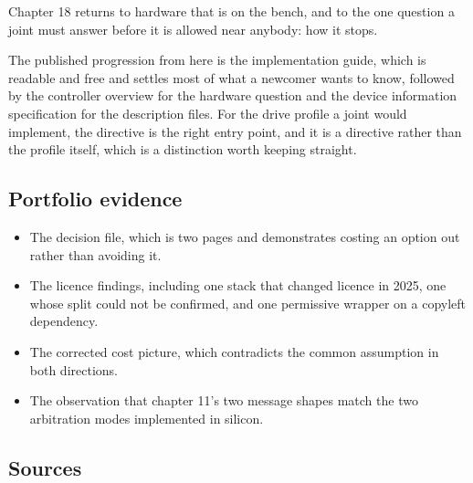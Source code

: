 Chapter 18 returns to hardware that is on the bench, and to the one question a
joint must answer before it is allowed near anybody: how it stops.

The published progression from here is the implementation guide, which is
readable and free and settles most of what a newcomer wants to know, followed by
the controller overview for the hardware question and the device information
specification for the description files. For the drive profile a joint would
implement, the directive is the right entry point, and it is a directive rather
than the profile itself, which is a distinction worth keeping straight.

\subsection*{Portfolio evidence}

\begin{itemize}
\item The decision file, which is two pages and demonstrates costing an option
out rather than avoiding it.
\item The licence findings, including one stack that changed licence in 2025,
one whose split could not be confirmed, and one permissive wrapper on a copyleft
dependency.
\item The corrected cost picture, which contradicts the common assumption in
both directions.
\item The observation that chapter 11's two message shapes match the two
arbitration modes implemented in silicon.
\end{itemize}

\subsection*{Sources}

